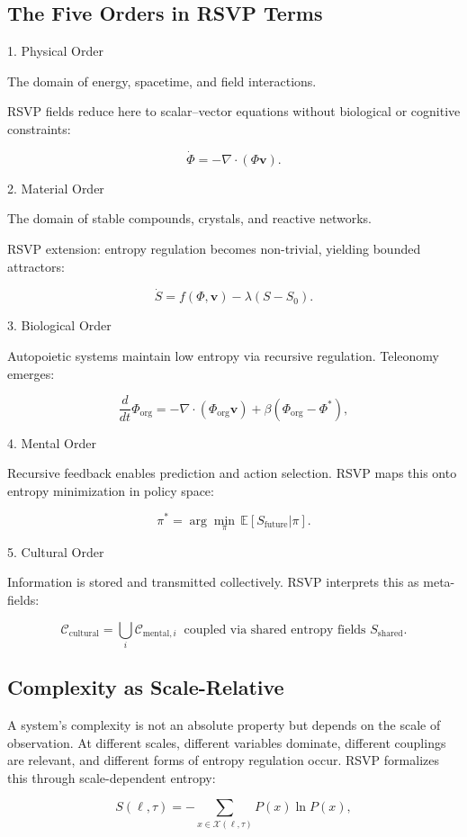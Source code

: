 \documentclass[12pt]{book}
\begin{document}
\subsection{The Five Orders in RSVP Terms}
1. Physical Order

The domain of energy, spacetime, and field interactions.

RSVP fields reduce here to scalar–vector equations without biological or cognitive constraints:

\[ \dot{\Phi} = -\nabla \cdot (\Phi \mathbf{v}). \]

2. Material Order

The domain of stable compounds, crystals, and reactive networks.

RSVP extension: entropy regulation becomes non-trivial, yielding bounded attractors:

\[ \dot{S} = f(\Phi, \mathbf{v}) - \lambda (S-S_0). \]

3. Biological Order

Autopoietic systems maintain low entropy via recursive regulation. Teleonomy emerges:

\[ \frac{d}{dt}\Phi_{\text{org}} = -\nabla \cdot (\Phi_{\text{org}}\mathbf{v}) + \beta(\Phi_{\text{org}} - \Phi^*), \]

4. Mental Order

Recursive feedback enables prediction and action selection. RSVP maps this onto entropy minimization in policy space:

\[ \pi^* = \arg\min_\pi \, \mathbb{E}[S_{\text{future}}|\pi]. \]

5. Cultural Order

Information is stored and transmitted collectively. RSVP interprets this as meta-fields:

\[ \mathcal{C}_{\text{cultural}} = \bigcup_i \mathcal{C}_{\text{mental}, i} \;\; \text{coupled via shared entropy fields } S_{\text{shared}}. \]

\subsection{Complexity as Scale-Relative}
A system’s complexity is not an absolute property but depends on the scale of observation. At different scales, different variables dominate, different couplings are relevant, and different forms of entropy regulation occur. RSVP formalizes this through scale-dependent entropy:

\[ S(\ell, \tau) = -\sum_{x \in \mathcal{X}(\ell, \tau)} P(x) \ln P(x), \]
\end{document}
